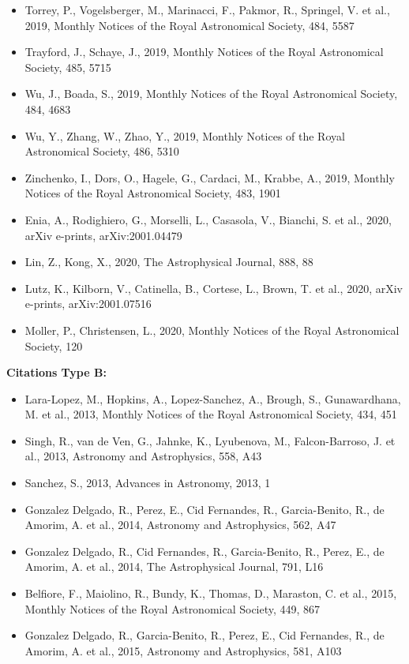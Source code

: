 \documentclass{letter}
\begin{document}
\begin{enumerate}
\begin{itemize}
\item Torrey, P., Vogelsberger, M., Marinacci, F., Pakmor, R., Springel, V. et al., 2019, Monthly Notices of the Royal Astronomical Society, 484, 5587
\item Trayford, J., Schaye, J., 2019, Monthly Notices of the Royal Astronomical Society, 485, 5715
\item Wu, J., Boada, S., 2019, Monthly Notices of the Royal Astronomical Society, 484, 4683
\item Wu, Y., Zhang, W., Zhao, Y., 2019, Monthly Notices of the Royal Astronomical Society, 486, 5310
\item Zinchenko, I., Dors, O., Hagele, G., Cardaci, M., Krabbe, A., 2019, Monthly Notices of the Royal Astronomical Society, 483, 1901
\item Enia, A., Rodighiero, G., Morselli, L., Casasola, V., Bianchi, S. et al., 2020, arXiv e-prints, arXiv:2001.04479
\item Lin, Z., Kong, X., 2020, The Astrophysical Journal, 888, 88
\item Lutz, K., Kilborn, V., Catinella, B., Cortese, L., Brown, T. et al., 2020, arXiv e-prints, arXiv:2001.07516
\item Moller, P., Christensen, L., 2020, Monthly Notices of the Royal Astronomical Society, 120
\end{itemize}
{\bf Citations Type B:}
\begin{itemize}
\item Lara-Lopez, M., Hopkins, A., Lopez-Sanchez, A., Brough, S., Gunawardhana, M. et al., 2013, Monthly Notices of the Royal Astronomical Society, 434, 451
\item Singh, R., van de Ven, G., Jahnke, K., Lyubenova, M., Falcon-Barroso, J. et al., 2013, Astronomy and Astrophysics, 558, A43
\item Sanchez, S., 2013, Advances in Astronomy, 2013, 1
\item Gonzalez Delgado, R., Perez, E., Cid Fernandes, R., Garcia-Benito, R., de Amorim, A. et al., 2014, Astronomy and Astrophysics, 562, A47
\item Gonzalez Delgado, R., Cid Fernandes, R., Garcia-Benito, R., Perez, E., de Amorim, A. et al., 2014, The Astrophysical Journal, 791, L16
\item Belfiore, F., Maiolino, R., Bundy, K., Thomas, D., Maraston, C. et al., 2015, Monthly Notices of the Royal Astronomical Society, 449, 867
\item Gonzalez Delgado, R., Garcia-Benito, R., Perez, E., Cid Fernandes, R., de Amorim, A. et al., 2015, Astronomy and Astrophysics, 581, A103

\end{itemize}
\end{enumerate}
\end{document}
